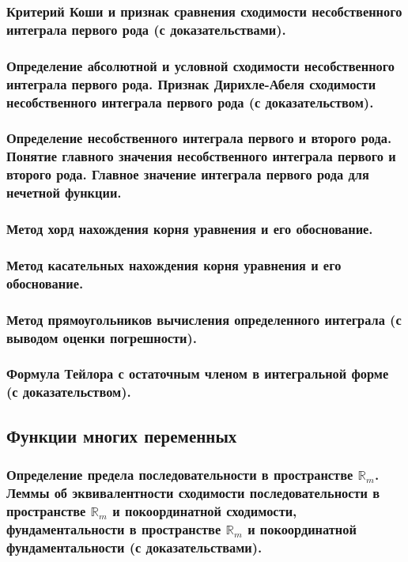 \documentclass[10pt]{article}
\begin{document}
    \subsubsection{Критерий Коши и признак сравнения сходимости несобственного интеграла первого рода (с доказательствами).}
    \subsubsection{Определение абсолютной и условной сходимости несобственного интеграла первого рода. Признак Дирихле-Абеля сходимости несобственного интеграла первого рода (с доказательством).}
    \subsubsection{Определение несобственного интеграла первого и второго рода. Понятие главного значения несобственного интеграла первого и второго рода. Главное значение интеграла первого рода для нечетной функции.}
    \subsubsection{Метод хорд нахождения корня уравнения и его обоснование.}
    \subsubsection{Метод касательных нахождения корня уравнения и его обоснование.}
    \subsubsection{Метод прямоугольников вычисления определенного интеграла (с выводом оценки погрешности).}
    \subsubsection{Формула Тейлора с остаточным членом в интегральной форме (с доказательством).}
    \subsection{Функции многих переменных}
    \subsubsection{Определение предела последовательности в пространстве \texorpdfstring{$\mathbb{R}_m$}{Rm}. Леммы об эквивалентности сходимости последовательности в пространстве \texorpdfstring{$\mathbb{R}_m$}{Rm} и покоординатной сходимости, фундаментальности в пространстве \texorpdfstring{$\mathbb{R}_m$}{Rm} и покоординатной фундаментальности (с доказательствами).}
\end{document}
